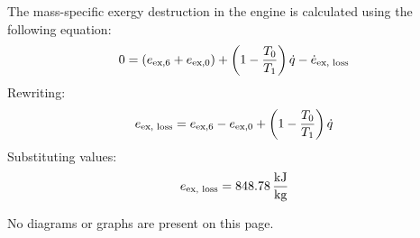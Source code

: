 The mass-specific exergy destruction in the engine is calculated using the following equation:  
\[
0 = (e_{\text{ex,6}} + e_{\text{ex,0}}) + \left( 1 - \frac{T_0}{T_1} \right) \dot{q} - \dot{e}_{\text{ex, \text{loss}}}
\]  
Rewriting:  
\[
e_{\text{ex, \text{loss}}} = e_{\text{ex,6}} - e_{\text{ex,0}} + \left( 1 - \frac{T_0}{T_1} \right) \dot{q}
\]  
Substituting values:  
\[
e_{\text{ex, \text{loss}}} = 848.78 \, \frac{\text{kJ}}{\text{kg}}
\]  

No diagrams or graphs are present on this page.